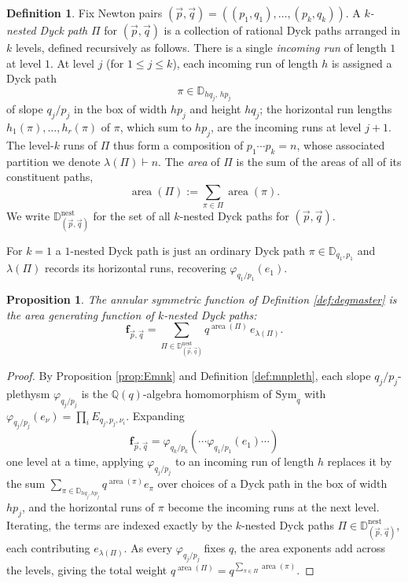 \documentclass{amsart}
\numberwithin{equation}{section}
\newtheorem{proposition}[lemma]{Proposition}%
\theoremstyle{definition}
\newtheorem{definition}[lemma]{Definition}%
\def\Sym{{\mathrm{Sym}}}
\newcommand{\frs}{\mathbf{f}_{\vec{p},\vec{q}}}
\newcommand{\fpq}{\frs}
\newcommand{\Q}{{\mathbb Q}}
\newcommand{\Dyck}{\mathbb{D}}
\newcommand{\nDyck}{\mathbb{D}^{\mathrm{nest}}}
\DeclareMathOperator{\area}{\mathrm{area}}
\begin{document}
\begin{definition}
\label{def:nesteddyck}
Fix Newton pairs $(\vec p,\vec q)=((p_1,q_1),\ldots,(p_k,q_k))$. A {\em $k$-nested Dyck path} $\Pi$ for $(\vec p,\vec q)$ is a collection of rational Dyck paths arranged in $k$ levels, defined recursively as follows. There is a single {\em incoming run} of length $1$ at level $1$. At level $j$ (for $1\le j\le k$), each incoming run of length $h$ is assigned a Dyck path
$$\pi\in\Dyck_{hq_j,\,hp_j}$$
of slope $q_j/p_j$ in the box of width $hp_j$ and height $hq_j$; the horizontal run lengths $h_1(\pi),\ldots,h_{r}(\pi)$ of $\pi$, which sum to $hp_j$, are the incoming runs at level $j+1$. The level-$k$ runs of $\Pi$ thus form a composition of $p_1\cdots p_k=n$, whose associated partition we denote $\lambda(\Pi)\vdash n$. The {\em area} of $\Pi$ is the sum of the areas of all of its constituent paths,
$$\area(\Pi):=\sum_{\pi\in\Pi}\area(\pi).$$
We write $\nDyck_{(\vec p,\vec q)}$ for the set of all $k$-nested Dyck paths for $(\vec p,\vec q)$.
\end{definition}

For $k=1$ a $1$-nested Dyck path is just an ordinary Dyck path $\pi\in\Dyck_{q_1,p_1}$ and $\lambda(\Pi)$ records its horizontal runs, recovering $\varphi_{q_1/p_1}(e_1)$.

\begin{proposition}
\label{prop:annularformula}
The annular symmetric function of Definition \ref{def:degmaster} is the area generating function of $k$-nested Dyck paths:
\begin{equation}
\label{eq:annularformula}
\fpq=\sum_{\Pi\in\nDyck_{(\vec p,\vec q)}}q^{\area(\Pi)}\,e_{\lambda(\Pi)}.
\end{equation}
\end{proposition}
\begin{proof}
By Proposition \ref{prop:Emnk} and Definition \ref{def:mnpleth}, each slope $q_j/p_j$-plethysm $\varphi_{q_j/p_j}$ is the $\Q(q)$-algebra homomorphism of $\Sym_q$ with $\varphi_{q_j/p_j}(e_\nu)=\prod_i E_{q_j,p_j,\nu_i}$. Expanding $$\fpq=\varphi_{q_k/p_k}(\cdots\varphi_{q_1/p_1}(e_1)\cdots)$$ one level at a time, applying $\varphi_{q_j/p_j}$ to an incoming run of length $h$ replaces it by the sum $\sum_{\pi\in\Dyck_{hq_j,hp_j}}q^{\area(\pi)}e_\pi$ over choices of a Dyck path in the box of width $hp_j$, and the horizontal runs of $\pi$ become the incoming runs at the next level. Iterating, the terms are indexed exactly by the $k$-nested Dyck paths $\Pi\in\nDyck_{(\vec p,\vec q)}$, each contributing $e_{\lambda(\Pi)}$. As every $\varphi_{q_j/p_j}$ fixes $q$, the area exponents add across the levels, giving the total weight $q^{\area(\Pi)}=q^{\sum_{\pi\in\Pi}\area(\pi)}$.
\end{proof}
\end{document}

